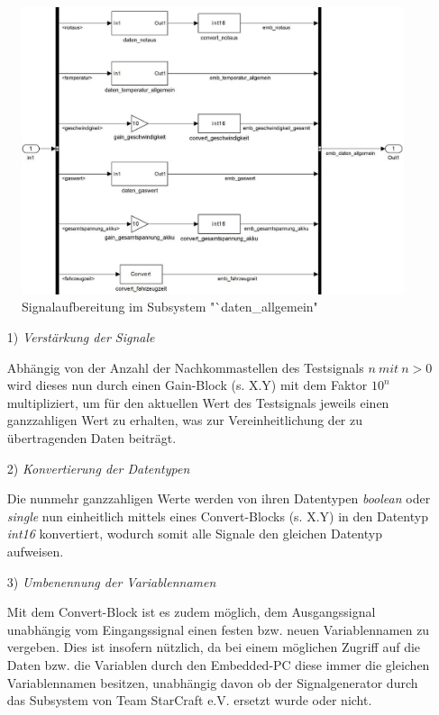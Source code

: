 \documentclass[fontsize = 12pt, paper = a4]{scrreprt}
\begin{document}
\begin{figure}[h]
\centering
\includegraphics[scale = 0.70]{collallgemein}
\caption{Signalaufbereitung im Subsystem "`daten\_allgemein"}
\end{figure} 


\begin{itemize}

\item[1)] \textit{Verstärkung der Signale}

Abhängig von der Anzahl der Nachkommastellen des Testsignals $n\ mit\ n>0$ wird dieses nun durch einen Gain-Block (s. X.Y) mit dem Faktor $10^n$ multipliziert, um für den aktuellen Wert des Testsignals jeweils einen ganzzahligen Wert zu erhalten, was zur Vereinheitlichung der zu übertragenden Daten beiträgt.

\item[2)] \textit{Konvertierung der Datentypen}

Die nunmehr ganzzahligen Werte werden von ihren Datentypen \textit{boolean} oder \textit{single} nun einheitlich mittels eines Convert-Blocks (s. X.Y) in den Datentyp \textit{int16} konvertiert, wodurch somit alle Signale den gleichen Datentyp aufweisen.  

\item[3)] \textit{Umbenennung der Variablennamen}

Mit dem Convert-Block ist es zudem möglich, dem Ausgangssignal unabhängig vom Eingangssignal einen festen bzw. neuen Variablennamen zu vergeben. Dies ist insofern nützlich, da bei einem möglichen Zugriff auf die Daten bzw. die Variablen durch den Embedded-PC diese immer die gleichen Variablennamen besitzen, unabhängig davon ob der Signalgenerator durch das Subsystem von Team StarCraft e.V. ersetzt wurde oder nicht.

\end{itemize}  
\end{document}
